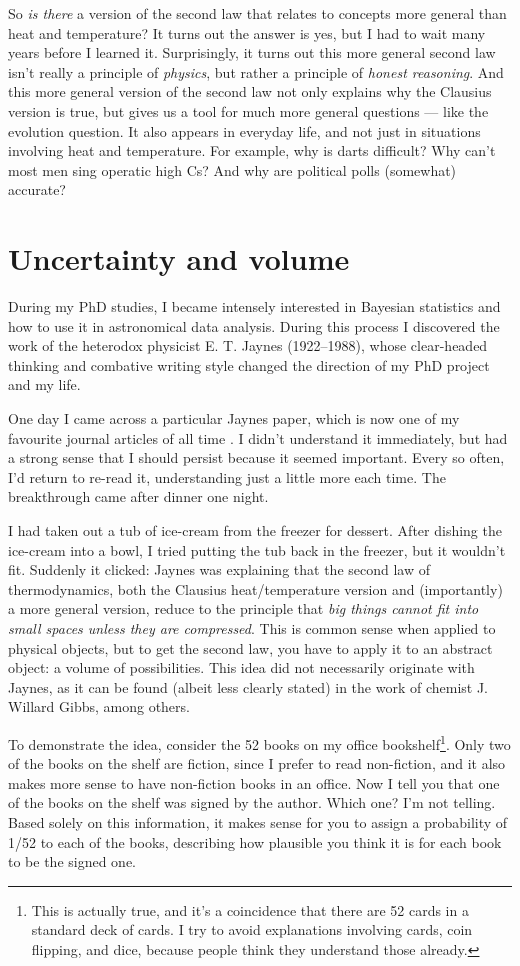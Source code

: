 \documentclass[a4paper, 12pt]{article}
\begin{document}
So {\em is there} a version of the second law that relates to concepts more
general than heat and temperature?
It turns out the answer is yes, but I had to wait many years before I learned it.
Surprisingly, it turns out this more general second law isn't really a
principle of {\em physics}, but rather a
principle of {\em honest reasoning}. And this more general version of the
second law not only explains why the Clausius version is true, but gives us
a tool for much more general questions --- like the evolution question.
It also appears in everyday life, and not just in situations involving heat and
temperature. For example,
why is darts difficult? Why can't most men sing operatic high Cs?
And why are political polls (somewhat) accurate?

\section*{Uncertainty and volume}
During my PhD studies, I became intensely interested in Bayesian statistics
\citep{brewer}
and how to use it in astronomical data analysis. During this process I
discovered the work of the heterodox physicist E. T. Jaynes \citep{jaynes_site}
(1922--1988), whose clear-headed thinking and combative writing style
changed the direction of my PhD project and my life.

One day I came across a particular Jaynes paper, which is now one of my
favourite journal articles of all time
\citep{jaynes}. I didn't understand it
immediately, but had a strong sense that I should persist because it seemed
important. Every so often, I'd return to re-read it, understanding
just a little more each time. The breakthrough came after dinner one
night.

I had taken out a tub of ice-cream from the freezer for dessert. After dishing
the ice-cream into a bowl, I tried putting the tub back in the freezer, but
it wouldn't fit. Suddenly it clicked: Jaynes was explaining that
the second law of thermodynamics, both the Clausius heat/temperature version
and (importantly) a more general version, reduce to the
principle that {\em big things cannot fit into small spaces unless they are
compressed}. This is common sense when applied to physical objects, but to
get the second law, you have to apply it to an abstract object: a volume
of possibilities. This idea did not necessarily originate with Jaynes, as it
can be found (albeit less clearly stated)
in the work of chemist J. Willard Gibbs, among others.

To demonstrate the idea, consider the 52 books on my office bookshelf\footnote{This
is actually true, and it's a coincidence that there are 52 cards in a standard
deck of cards. I try to avoid explanations involving cards, coin flipping, and
dice, because people think they understand those already.}.
Only two of the books on the shelf are fiction, since I prefer to read
non-fiction, and it also makes more sense to have non-fiction books in an
office. Now I tell you that one of the books on the shelf was
signed by the author. Which one? I'm not telling. Based solely on this
information, it makes sense for you to assign a probability of 1/52 to each of the
books, describing how plausible you think it is for each book to be the signed
one.
\end{document}
